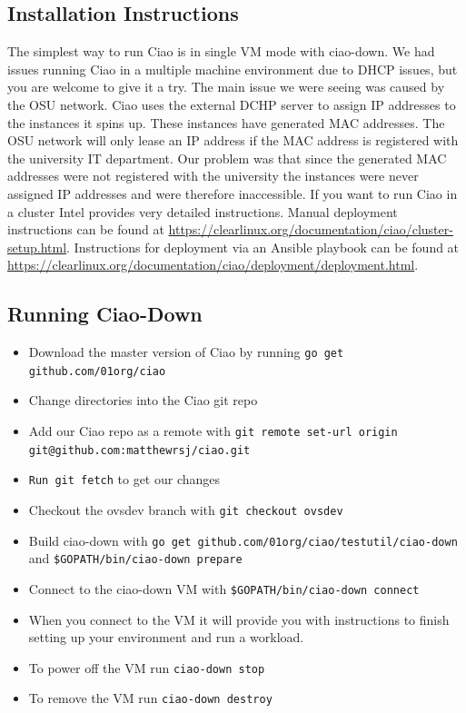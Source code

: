 \documentclass[10pt,onecolumn,journal,draftclsnofoot]{IEEEtran}
\begin{document}
\subsection{Installation Instructions}
The simplest way to run Ciao is in single VM mode with ciao-down.
We had issues running Ciao in a multiple machine environment due to DHCP issues, but you are welcome to give it a try.
The main issue we were seeing was caused by the OSU network. Ciao uses the external DCHP server to assign IP addresses
to the instances it spins up. These instances have generated MAC addresses. The OSU network will only lease an IP
address if the MAC address is registered with the university IT department. Our problem was that since the generated
MAC addresses were not registered with the university the instances were never assigned IP addresses and were therefore
inaccessible. If you want to run Ciao in a cluster Intel provides very detailed instructions.
Manual deployment instructions can be found at \url{https://clearlinux.org/documentation/ciao/cluster-setup.html}.
Instructions for deployment via an Ansible playbook can be found at\\
\url{https://clearlinux.org/documentation/ciao/deployment/deployment.html}.

\subsection{Running Ciao-Down}
\begin{itemize}
    \item Download the master version of Ciao by running 
          \texttt{go get github.com/01org/ciao}
    \item Change directories into the Ciao git repo
    \item Add our Ciao repo as a remote with \texttt{git remote set-url origin git@github.com:matthewrsj/ciao.git}
    \item \texttt{Run git fetch} to get our changes
    \item Checkout the ovsdev branch with \texttt{git checkout ovsdev}
    \item Build ciao-down with \texttt{go get github.com/01org/ciao/testutil/ciao-down}
    and \texttt{\$GOPATH/bin/ciao-down prepare}
    \item Connect to the ciao-down VM with \texttt{\$GOPATH/bin/ciao-down connect}
    \item When you connect to the VM it will provide you with instructions to finish setting up your
          environment and run a workload.
    \item To power off the VM run \texttt{ciao-down stop}
    \item To remove the VM run \texttt{ciao-down destroy}
\end{itemize}
\end{document}
